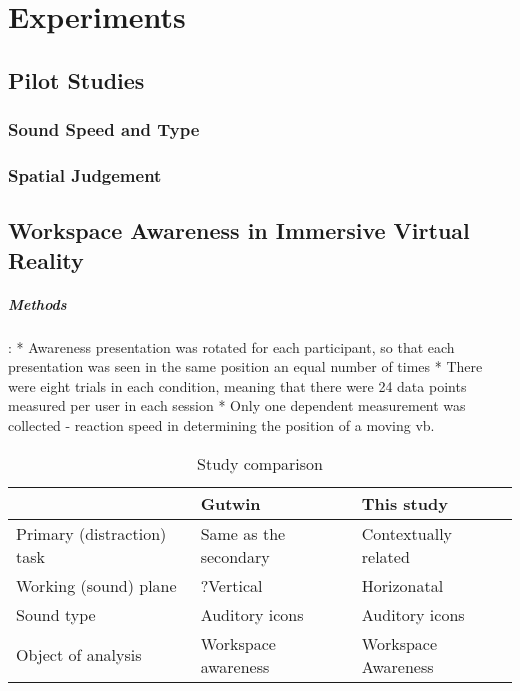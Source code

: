 
\chapter{Experiments}
\section{Pilot Studies}
\subsection{Sound Speed and Type}
\subsection{Spatial Judgement}
\section{Workspace Awareness in Immersive Virtual Reality}

\paragraph{Methods}




\cite{gutwin_chalk_2011}:
* Awareness presentation was rotated for each participant, so that each presentation was seen in the same position an equal number of times
* There were eight trials in each condition, meaning that there were 24 data points measured per user in each session
* Only one dependent measurement was collected - reaction speed in determining the position of a moving \gls{vb}.


\begin{table}[]
  \caption{Study comparison}
  \label{table:study_comp}
  \begin{tabular}{|l|l|l|}
  \hline
                             & Gutwin                & This study           \\ \hline
  Primary (distraction) task & Same as the secondary & Contextually related \\ \hline
  Working (sound) plane      & ?Vertical             & Horizonatal          \\ \hline
  Sound type                 & Auditory icons        & Auditory icons       \\ \hline
  Object of analysis         & Workspace awareness   & Workspace Awareness  \\ \hline
  \end{tabular}
\end{table}


